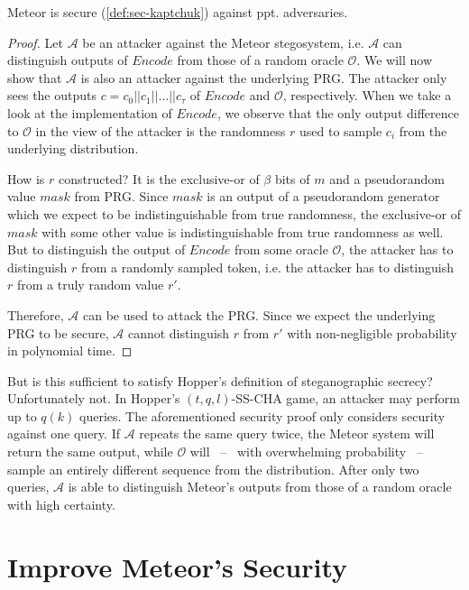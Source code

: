 \begin{theorem}
  Meteor is secure (\autoref{def:sec-kaptchuk}) against ppt. adversaries. 
\label{thm:meteor-secure}
\end{theorem}
\begin{proof}
  Let $\mathcal{A}$ be an attacker against the Meteor stegosystem, i.e. $\mathcal{A}$ can distinguish outputs of $Encode$ from those of a random oracle $\mathcal{O}$. 
  We will now show that $\mathcal{A}$ is also an attacker against the underlying PRG.
  The attacker only sees the outputs $c = c_0 ||c_1 || \dots || c_{\tau}$ of $Encode$ and $\mathcal{O}$, respectively.
  When we take a look at the implementation of $Encode$, we observe that the only output difference to $\mathcal{O}$ in the view of the attacker is the randomness $r$ used to sample $c_i$ from the underlying distribution.
  
  How is $r$ constructed? 
  It is the exclusive-or of $\beta$ bits of $m$ and a pseudorandom value $mask$ from PRG.
  Since $mask$ is an output of a pseudorandom generator which we expect to be indistinguishable from true randomness, the exclusive-or of $mask$ with some other value is indistinguishable from true randomness as well.
  But to distinguish the output of $Encode$ from some oracle $\mathcal{O}$, the attacker has to distinguish $r$ from a randomly sampled token, i.e. the attacker has to distinguish $r$ from a truly random value $r'$.
  
  Therefore, $\mathcal{A}$ can be used to attack the PRG.
  Since we expect the underlying PRG to be secure, $\mathcal{A}$ cannot distinguish $r$ from $r'$ with non-negligible probability in polynomial time.
\end{proof}

But is this sufficient to satisfy Hopper's definition of steganographic secrecy?
Unfortunately not.
In Hopper's $(t,q,l)$-SS-CHA game, an attacker may perform up to $q(k)$ queries.
The aforementioned security proof only considers security against one query.
If $\mathcal{A}$ repeats the same query twice, the Meteor system will return the same output, while $\mathcal{O}$ will~ --~ with overwhelming probability~ --~ sample an entirely different sequence from the distribution.
After only two queries, $\mathcal{A}$ is able to distinguish Meteor's outputs from those of a random oracle with high certainty.


\section{Improve Meteor's Security}

